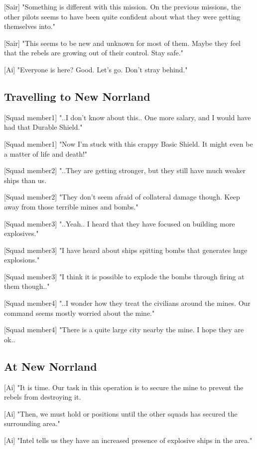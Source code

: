 \documentclass[a4paper,12pt]{article}
\begin{document}
[Sair] "Something is different with this mission. On the previous missions, the other pilots
seems to have been quite confident about what they were getting themselves into." 

[Sair] "This seems to be new and unknown for most of them. Maybe they feel that the rebels are growing out
of their control. Stay safe."

[Ai] "Everyone is here? Good. Let's go. Don't stray behind."

\subsection{Travelling to New Norrland}

[Squad member1] "..I don't know about this.. One more salary, and I would have had that
Durable Shield."

[Squad member1] "Now I'm stuck with this crappy Basic Shield. It might even be a matter of life and death!"

[Squad member2] "..They are getting stronger, but they still have much weaker ships than us. 

[Squad member2] "They don't seem afraid of collateral damage though. Keep away from those terrible mines and bombs."

[Squad member3] "..Yeah.. I heard that they have focused on building more explosives."

[Squad member3] "I have heard about ships spitting bombs that generates huge explosions." 

[Squad member3] "I think it is possible to explode the bombs through firing at them though.."

[Squad member4] "..I wonder how they treat the civilians around the mines. Our command seems mostly worried
about the mine." 

[Squad member4] "There is a quite large city nearby the mine. I hope they are ok..

\subsection{At New Norrland}

[Ai] "It is time. Our task in this operation is to secure the mine to prevent the rebels from destroying it. 

[Ai] "Then, we must hold or positions until the other squads has secured the surrounding area."

[Ai] "Intel tells us they have an increased presence of explosive ships in the area." 
\end{document}
